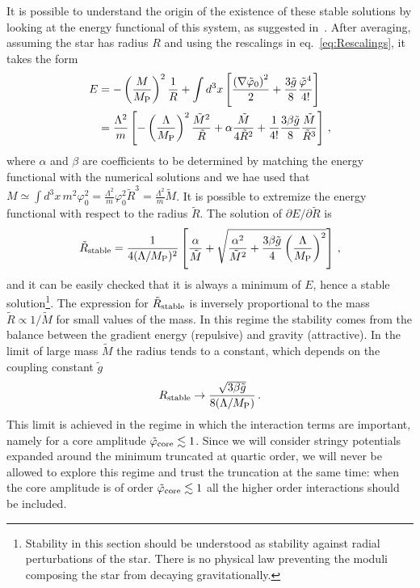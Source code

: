 \documentclass[11pt,a4paper]{article}
\begin{document}
It is possible to understand the origin of the existence of these stable solutions by looking at the energy functional of this system, as suggested in~\cite{Visinelli:2017ooc, Schiappacasse:2017ham}. After averaging, assuming the star has radius $R$ and using the rescalings in eq.~\eqref{eq:Rescalings}, it takes the form
\begin{align}
E & = -\left(\frac{M}{M_{\rm P}}\right)^2 \frac{1}{R} + \int d^3 x\left[\frac{\left(\nabla \tilde\varphi_0\right)^2}{2} + \frac{3 \tilde{g}}{8} \frac{\tilde\varphi^4}{4!}\right]  \nonumber \\
& = \frac{\Lambda^2}{m} \left[-\left(\frac{\Lambda}{M_{\rm P}}\right)^2 \frac{\tilde{M}^2}{\tilde{R}} + \alpha \frac{\tilde{M}}{4 \tilde{R}^2} + \frac{1}{4!} \frac{3 \beta \tilde{g}}{8} \frac{\tilde{M}}{\tilde{R}^3}\right] \,,
\end{align}
where $\alpha$ and $\beta$ are coefficients to be determined by matching the energy functional with the numerical solutions and we hae used that $M \simeq \int d^3x\, m^2 \varphi_0^2 = \frac{\Lambda^2}{m} \varphi_0^2 \tilde{R}^3 = \frac{\Lambda^2}{m} \tilde{M}$.
It is possible to extremize the energy functional with respect to the radius $\tilde{R}$. The solution of $\partial E/\partial \tilde{R}$ is
\begin{equation}
\label{eq:RStable}
\tilde{R}_{\rm stable} = \frac{1}{4 (\Lambda/M_{\rm P})^2} \left[\frac{\alpha}{\tilde{M}} + \sqrt{\frac{\alpha^2}{\tilde{M}^2} + \frac{3 \beta \tilde{g}}{4} \left(\frac{\Lambda}{M_{\rm P}}\right)^2} \right]\,,
\end{equation}
and it can be easily checked that it is always a minimum of $E$, hence a stable solution\footnote{Stability in this section should be understood as stability against radial perturbations of the star. There is no physical law preventing the moduli composing the star from decaying gravitationally.}. The expression for $\tilde{R}_{\rm stable}$ is inversely proportional to the mass $\tilde{R} \propto 1/\tilde{M}$ for small values of the mass. In this regime the stability comes from the balance between the gradient energy (repulsive) and gravity (attractive). In the limit of large mass $\tilde{M}$ the radius tends to a constant, which depends on the coupling constant $\tilde{g}$
\begin{equation}
\label{eq:AsymptoticRadius}
R_{\rm stable} \rightarrow \frac{\sqrt{3 \beta \tilde{g}}}{8 (\Lambda/M_{\rm P})} \,.
\end{equation}
This limit is achieved in the regime in which the interaction terms are important, namely for a core amplitude $\tilde\varphi_{\rm core} \lesssim 1$. Since we will consider stringy potentials expanded around the minimum truncated at quartic order, we will never be allowed to explore this regime and trust the truncation at the same time: when the core amplitude is of order $\tilde\varphi_{\rm core} \lesssim 1$ all the higher order interactions should be included.
\end{document}
